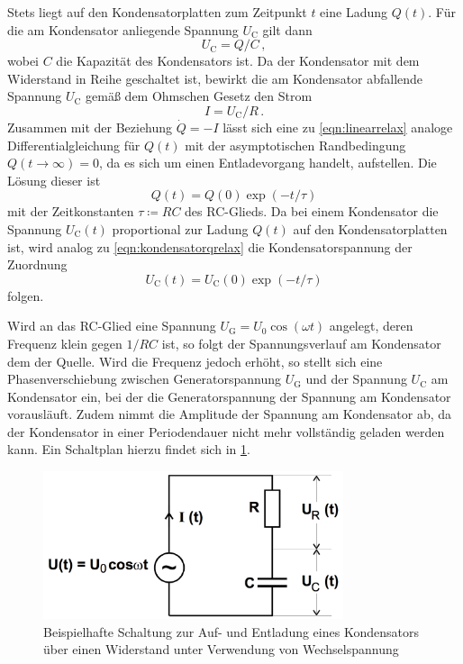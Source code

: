 Stets liegt auf den Kondensatorplatten zum Zeitpunkt $t$ eine Ladung $Q(t)$. Für
die am Kondensator anliegende Spannung $U_{\text{C}}$ gilt dann
\begin{equation}
  U_{\text{C}} = Q / C\,,
\end{equation}
wobei $C$ die Kapazität des Kondensators ist. Da der Kondensator mit dem Widerstand
in Reihe geschaltet ist, bewirkt die am Kondensator abfallende Spannung $U_{\text{C}}$
gemäß dem Ohmschen Gesetz den Strom
\begin{equation}
  I = U_{\text{C}} / R\,.
\end{equation}
Zusammen mit der Beziehung $\dot{Q} = -I$ lässt sich eine zu \eqref{eqn:linearrelax}
analoge Differentialgleichung für $Q(t)$ mit der asymptotischen Randbedingung
$Q(t \to \infty) = 0$, da es sich um einen Entladevorgang handelt, aufstellen. Die
Lösung dieser ist
\begin{equation}
  Q(t) = Q(0) \exp(-t/\tau)
  \label{eqn:kondensatorqrelax}
\end{equation}
mit der Zeitkonstanten $\tau \coloneqq RC$ des RC-Glieds.
Da bei einem Kondensator die Spannung $U_\text{C}(t)$ proportional zur Ladung
$Q(t)$ auf den Kondensatorplatten ist, wird analog zu \eqref{eqn:kondensatorqrelax}
die Kondensatorspannung der Zuordnung
\begin{equation}
  U_\text{C}(t) = U_\text{C}(0) \exp(-t/\tau)
  \label{eqn:kondensatorurelax}
\end{equation}
folgen.


Wird an das RC-Glied eine Spannung $U_{\text{G}}=U_{\text{0}}\cos(\omega t)$ angelegt, deren
Frequenz klein gegen $1/RC$ ist, so folgt der Spannungsverlauf am Kondensator
dem der Quelle. Wird die Frequenz jedoch erhöht, so stellt sich eine Phasenverschiebung
zwischen Generatorspannung $U_{\text{G}}$ und der Spannung $U_{\text{C}}$ am Kondensator
ein, bei der die Generatorspannung der Spannung am Kondensator vorausläuft.
Zudem nimmt die Amplitude der Spannung am Kondensator ab, da der Kondensator in einer
Periodendauer nicht mehr vollständig geladen werden kann. Ein Schaltplan hierzu findet
sich in \ref{fig:Aufbau_2}.
\begin{figure}
  \centering
  \includegraphics[width=250pt]{data/aufbau_2.png}
  \caption{Beispielhafte Schaltung zur Auf- und Entladung eines Kondensators über
  einen Widerstand unter Verwendung von Wechselspannung \cite{Versuchsanleitung}}
  \label{fig:Aufbau_2}
\end{figure}


